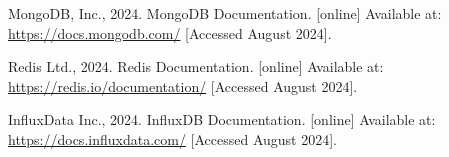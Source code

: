 \documentclass[a4paper,11pt]{report}
\renewcommand*\contentsname{Daftar Isi}
\begin{document}




\clearpage

    



\setcounter{page}{1}

\clearpage
{}
\tableofcontents
\renewcommand{\contentsname}{Daftar Isi}

\clearpage
{}
{}
\listoffigures

\clearpage
{}
{}
\listoftables



\clearpage
{}
\setcounter{page}{1}

\renewcommand\bibname{Daftar Pustaka}

\clearpage
{}






%
%
\clearpage
{}
{}
\renewcommand{\bibname}{Daftar Pustaka}

\begin{thebibliography}{99}

 MongoDB, Inc., 2024. MongoDB Documentation. [online] Available at: \url{https://docs.mongodb.com/} [Accessed August 2024].

 Redis Ltd., 2024. Redis Documentation. [online] Available at: \url{https://redis.io/documentation/} [Accessed August 2024].

 InfluxData Inc., 2024. InfluxDB Documentation. [online] Available at: \url{https://docs.influxdata.com/} [Accessed August 2024].

\end{thebibliography}


\clearpage



\end{document}
